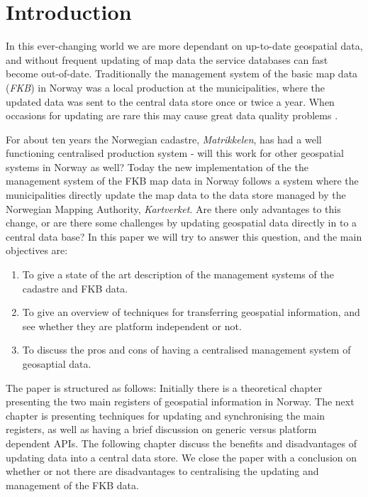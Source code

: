 

\chapter{Introduction}


In this ever-changing world we are more dependant on up-to-date geospatial data, and without frequent updating of map data the service databases can fast become out-of-date. Traditionally the management system of the basic map data (\textit{FKB}) in Norway was a local production at the municipalities, where the updated data was sent to the central data store once or twice a year. When occasions for updating are rare this may cause great data quality problems \citep{Lehto2015, Peng2005}. 

For about ten years the Norwegian cadastre, \textit{Matrikkelen}, has had a well functioning centralised production system \citep{Falkanger2017} - will this work for other geospatial systems in Norway as well? 
Today the new implementation of the the management system of the FKB map data in Norway follows a system where the municipalities directly update the map data to the data store managed by the Norwegian Mapping Authority, \textit{Kartverket}. Are there only advantages to this change, or are there some challenges by updating geospatial data directly in to a central data base?
In this paper we will try to answer this question, and the main objectives are:

\begin{enumerate}
\item To give a state of the art description of the management systems of the cadastre and FKB data.
\item To give an overview of techniques for transferring geospatial information, and see whether they are platform independent or not.
\item To discuss the pros and cons of having a centralised management system of geosaptial data.
\end{enumerate}



The paper is structured as follows: Initially there is a theoretical chapter presenting the two main registers of geospatial information in Norway. The next chapter is presenting techniques for updating and synchronising the main registers, as well as having a brief discussion on generic versus platform dependent APIs. 
The following chapter discuss the benefits and disadvantages of updating data into a central data store. We close the paper with a conclusion on whether or not there are disadvantages to centralising the updating and management of the FKB data.

